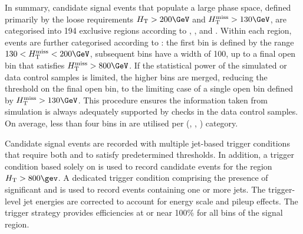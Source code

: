 In summary, candidate signal events that populate a large phase space,
defined primarily by the loose requirements $\scalht > 200\GeV$ and
$\HTmiss > 130\GeV$, are categorised into 194 exclusive regions
according to \njet, \nb, and \scalht. Within each region, events are
further categorised according to \HTmiss: the first bin is defined by
the range $130 < \HTmiss < 200\GeV$, subsequent bins have a width of
100\GeV, up to a final open bin that satisfies $\HTmiss > 800\GeV$. If
the statistical power of the simulated or data control samples is
limited, the higher \HTmiss bins are merged, reducing the threshold on
the final open bin, to the limiting case of a single open bin defined
by $\HTmiss > 130\GeV$. This procedure ensures the information taken
from simulation is always adequately supported by checks in the data
control samples. On average, less than four bins in \HTmiss are
utilised per (\njet, \nb, \scalht) category.

Candidate signal events are recorded with multiple jet-based trigger
conditions that require both \scalht and \alphat to satisfy
predetermined thresholds. In addition, a trigger condition based
solely on \scalht is used to record candidate events for the region
$\scalht > 800\gev$. A dedicated trigger condition comprising the
presence of significant \mht and \ETmiss is used to record events
containing one or more jets. The trigger-level jet energies are
corrected to account for energy scale and pileup effects. The trigger
strategy provides efficiencies at or near 100\% for all bins of the
signal region.
